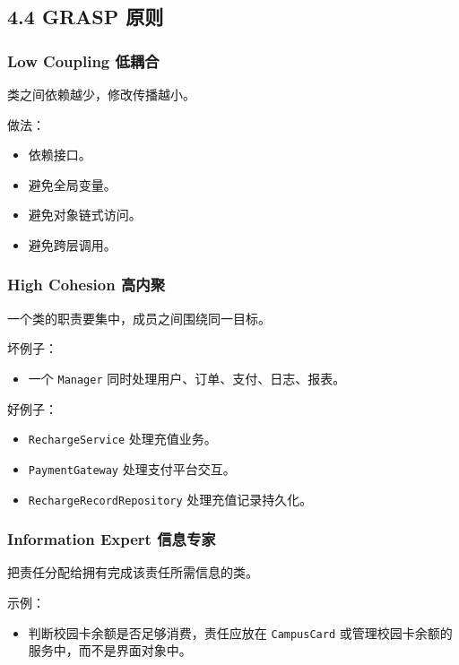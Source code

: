 \documentclass[UTF8,zihao=-4]{ctexart}
\begin{document}
\subsection{4.4 GRASP 原则}

\subsubsection{Low Coupling 低耦合}

类之间依赖越少，修改传播越小。

做法：

\begin{itemize}
\item 依赖接口。
\item 避免全局变量。
\item 避免对象链式访问。
\item 避免跨层调用。
\end{itemize}

\subsubsection{High Cohesion 高内聚}

一个类的职责要集中，成员之间围绕同一目标。

坏例子：

\begin{itemize}
\item 一个 \texttt{Manager} 同时处理用户、订单、支付、日志、报表。
\end{itemize}

好例子：

\begin{itemize}
\item \texttt{RechargeService} 处理充值业务。
\item \texttt{PaymentGateway} 处理支付平台交互。
\item \texttt{RechargeRecordRepository} 处理充值记录持久化。
\end{itemize}

\subsubsection{Information Expert 信息专家}

把责任分配给拥有完成该责任所需信息的类。

示例：

\begin{itemize}
\item 判断校园卡余额是否足够消费，责任应放在 \texttt{CampusCard} 或管理校园卡余额的服务中，而不是界面对象中。
\end{itemize}
\end{document}

